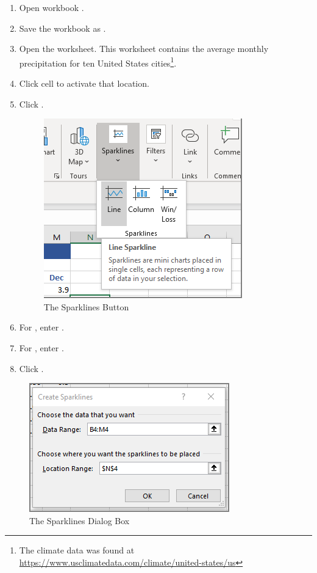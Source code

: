 \begin{enumbox}
	\begin{enumerate}
		\item Open workbook .
		\item Save the workbook as .
		\item Open the  worksheet. This worksheet contains the average monthly precipitation for ten United States cities\footnote{The climate data was found at \url{https://www.usclimatedata.com/climate/united-states/us}}.
		\item Click cell  to activate that location.
		\item Click .
	
		\begin{figure}[H]
			\centering
			\includegraphics[width=\maxwidth{.65\linewidth}]{gfx/ch08_fig01}
			\caption{The Sparklines Button}
			\label{08:fig01}
		\end{figure}
			
		\item For , enter .
		\item For , enter .
		\item Click .
	\end{enumerate}
\end{enumbox}

\begin{figure}[H]
	\centering
	\includegraphics[width=\maxwidth{.65\linewidth}]{gfx/ch08_fig02}
	\caption{The Sparklines Dialog Box}
	\label{08:fig02}
\end{figure}

